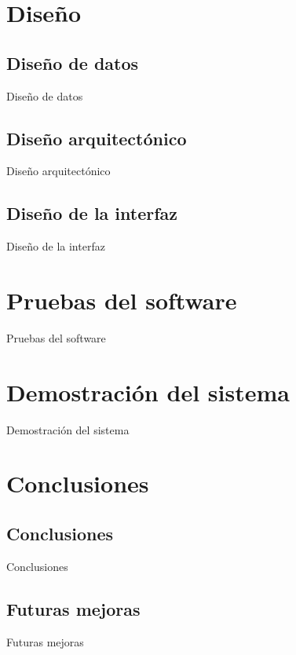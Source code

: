 \documentclass[10pt, hyperref={pdfpagelabels=false}]{beamer}
\begin{document}
  \section{Diseño}
    \subsection{Diseño de datos}
      \begin{frame}{Diseño de datos}

      \end{frame}

    \subsection{Diseño arquitectónico}
      \begin{frame}{Diseño arquitectónico}

      \end{frame}

    \subsection{Diseño de la interfaz}
      \begin{frame}{Diseño de la interfaz}

      \end{frame}


  \section{Pruebas del software}
    \begin{frame}{Pruebas del software}

    \end{frame}


  \section{Demostración del sistema}
    \begin{frame}{Demostración del sistema}

    \end{frame}


  \section{Conclusiones}
    \subsection{Conclusiones}
      \begin{frame}{Conclusiones}

      \end{frame}

    \subsection{Futuras mejoras}
      \begin{frame}{Futuras mejoras}

      \end{frame}
\end{document}
